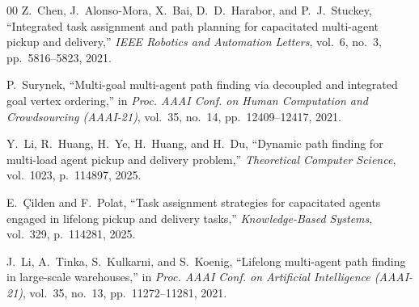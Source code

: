 \documentclass[journal]{IEEEtran}
\begin{document}
\begin{thebibliography}{00}
Z.~Chen, J.~Alonso-Mora, X.~Bai, D.~D.~Harabor, and P.~J.~Stuckey, ``Integrated task assignment and path planning for capacitated multi-agent pickup and delivery,'' \emph{IEEE Robotics and Automation Letters}, vol.~6, no.~3, pp.~5816--5823, 2021.

P.~Surynek, ``Multi-goal multi-agent path finding via decoupled and integrated goal vertex ordering,'' in \emph{Proc. AAAI Conf. on Human Computation and Crowdsourcing (AAAI-21)}, vol.~35, no.~14, pp.~12409--12417, 2021.

Y.~Li, R.~Huang, H.~Ye, H.~Huang, and H.~Du, ``Dynamic path finding for multi-load agent pickup and delivery problem,'' \emph{Theoretical Computer Science}, vol.~1023, p.~114897, 2025.

E.~{\c{C}}ilden and F.~Polat, ``Task assignment strategies for capacitated agents engaged in lifelong pickup and delivery tasks,'' \emph{Knowledge-Based Systems}, vol.~329, p.~114281, 2025.

J.~Li, A.~Tinka, S.~Kulkarni, and S.~Koenig, ``Lifelong multi-agent path finding in large-scale warehouses,'' in \emph{Proc. AAAI Conf. on Artificial Intelligence (AAAI-21)}, vol.~35, no.~13, pp.~11272--11281, 2021.
\end{thebibliography}
\end{document}
